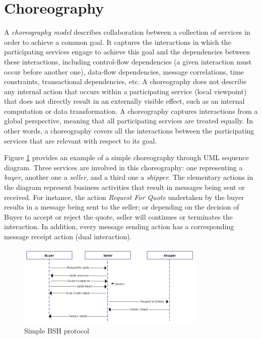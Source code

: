 \section{Choreography}

A \textit{choreography model} describes collaboration between a collection of services in order to achieve a common goal. It captures the interactions in which the participating services engage to achieve this goal and the dependencies between these interactions, including control-flow dependencies (a given interaction must occur before another one), data-flow dependencies, message correlations, time constraints, transactional dependencies, etc. A choreography does not describe any internal action that occurs within a participating service (local viewpoint) that does not directly result in an externally visible effect, such as an internal computation or data transformation. A choreography captures interactions from a global perspective, meaning that all participating services are treated equally. In other words, a choreography covers all the interactions between the participating services that are relevant with respect to its goal.

Figure \ref{fig:simplebsh} provides an example of a simple choreography through UML sequence diagram. Three services are involved in this choreography: one representing a \textit{buyer}, another one a \textit{seller}, and a third one a \textit{shipper}. The elementary actions in the diagram represent business activities that result in messages being sent or received. For instance, the action \textit{Request For Quote} undertaken by the buyer results in a message being sent to the seller; or depending on the decision of Buyer to accept or reject the quote, seller will continues or terminates the interaction. In addition, every message sending action has a corresponding message receipt action (dual interaction).

\begin{figure}
\centering
    \includegraphics[width=0.8\textwidth]{resources/Choreography_bsh.png}
    \caption{Simple BSH protocol}
    \label{fig:simplebsh}
\end{figure}

